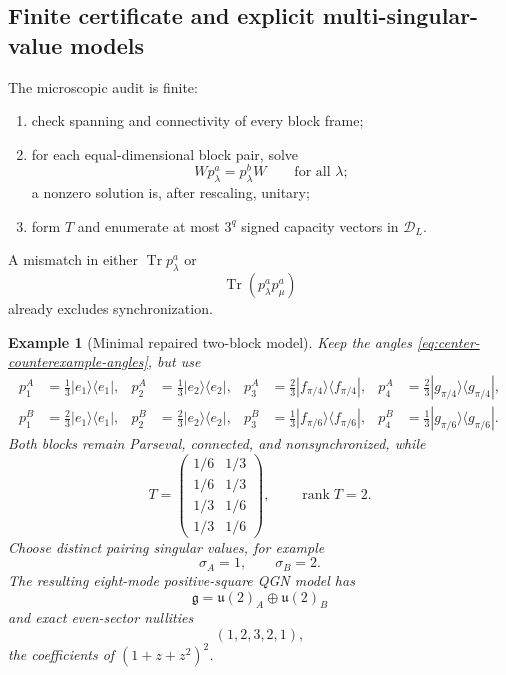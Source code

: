 \documentclass[11pt]{article}
\numberwithin{equation}{section}
\newtheorem{example}[theorem]{Example}
\newcommand{\Tr}{\operatorname{Tr}}
\newcommand{\fg}{\mathfrak g}
\newcommand{\rank}{\operatorname{rank}}
\begin{document}
\subsection{Finite certificate and explicit multi-singular-value models}

The microscopic audit is finite:
\begin{enumerate}[leftmargin=2.2em]
\item check spanning and connectivity of every block frame;
\item for each equal-dimensional block pair, solve
\begin{equation}
 Wp_\lambda^a=p_\lambda^bW
 \qquad\text{for all }\lambda;
 \label{eq:sylvester-sync}
\end{equation}
a nonzero solution is, after rescaling, unitary;
\item form $T$ and enumerate at most $3^q$ signed capacity vectors in $\mathcal D_L$.
\end{enumerate}
A mismatch in either $\Tr p_\lambda^a$ or
\begin{equation}
 \Tr(p_\lambda^ap_\mu^a)
 \label{eq:gram-sync-certificate}
\end{equation}
already excludes synchronization.

\begin{example}[Minimal repaired two-block model]
\label{ex:repaired-model}
Keep the angles \eqref{eq:center-counterexample-angles}, but use
\begin{align}
 p_1^A&=\frac13|e_1\rangle\langle e_1|,
 &
 p_2^A&=\frac13|e_2\rangle\langle e_2|,
 &
 p_3^A&=\frac23|f_{\pi/4}\rangle\langle f_{\pi/4}|,
 &
 p_4^A&=\frac23|g_{\pi/4}\rangle\langle g_{\pi/4}|,
 \nonumber\\
 p_1^B&=\frac23|e_1\rangle\langle e_1|,
 &
 p_2^B&=\frac23|e_2\rangle\langle e_2|,
 &
 p_3^B&=\frac13|f_{\pi/6}\rangle\langle f_{\pi/6}|,
 &
 p_4^B&=\frac13|g_{\pi/6}\rangle\langle g_{\pi/6}|.
 \label{eq:repaired-frames}
\end{align}
Both blocks remain Parseval, connected, and nonsynchronized, while
\begin{equation}
 T=
 \begin{pmatrix}
 1/6&1/3\\
 1/6&1/3\\
 1/3&1/6\\
 1/3&1/6
 \end{pmatrix},
 \qquad
 \rank T=2.
 \label{eq:repaired-T}
\end{equation}
Choose distinct pairing singular values, for example
\begin{equation}
 \sigma_A=1,
 \qquad
 \sigma_B=2.
 \label{eq:repaired-singular-values}
\end{equation}
The resulting eight-mode positive-square QGN model has
\begin{equation}
 \fg=\mathfrak u(2)_A\oplus\mathfrak u(2)_B
 \label{eq:repaired-lie}
\end{equation}
and exact even-sector nullities
\begin{equation}
 (1,2,3,2,1),
 \label{eq:repaired-nullities}
\end{equation}
the coefficients of $(1+z+z^2)^2$.
\end{example}
\end{document}
